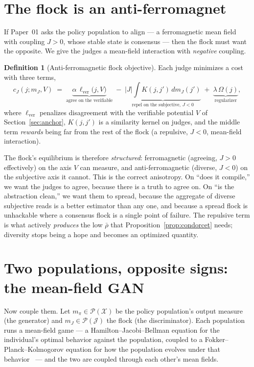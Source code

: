 \documentclass[11pt]{article}
\theoremstyle{definition}
\newtheorem{definition}{Definition}
\theoremstyle{remark}
\newcommand{\mpi}{m_{\pi}}
\newcommand{\mJ}{m_{J}}
\newcommand{\Prob}{\mathcal{P}}
\newcommand{\Xspace}{\mathcal{X}}
\newcommand{\Jspace}{\mathcal{J}}
\begin{document}
\section{The flock is an anti-ferromagnet}
\label{sec:antiferro}

If Paper~01 asks the policy population to align --- a ferromagnetic mean field with coupling $J>0$, whose
stable state is consensus --- then the flock must want the opposite. We give the judges a mean-field
interaction with \emph{negative} coupling.

\begin{definition}[Anti-ferromagnetic flock objective]
Each judge minimizes a cost with three terms,
\[
  c_J(j;\mJ,V)
   \;=\; \underbrace{\alpha\,\ell_{\text{ver}}\!\big(j,V\big)}_{\text{agree on the verifiable}}
   \;-\; \underbrace{|J|\!\!\int\! K(j,j')\,d\mJ(j')}_{\text{repel on the subjective, }J<0}
   \;+\; \underbrace{\lambda\,\Omega(j)}_{\text{regularizer}} ,
\]
where $\ell_{\text{ver}}$ penalizes disagreement with the verifiable potential $V$ of
Section~\ref{sec:anchor}, $K(j,j')$ is a similarity kernel on judges, and the middle term \emph{rewards}
being far from the rest of the flock (a repulsive, $J<0$, mean-field interaction).
\end{definition}

The flock's equilibrium is therefore \emph{structured}: ferromagnetic (agreeing, $J>0$ effectively) on
the axis $V$ can measure, and anti-ferromagnetic (diverse, $J<0$) on the subjective axis it cannot. This is
the correct anisotropy. On ``does it compile,'' we want the judges to agree, because there is a truth to
agree on. On ``is the abstraction clean,'' we want them to spread, because the aggregate of diverse
subjective reads is a better estimator than any one, and because a spread flock is unhackable where a
consensus flock is a single point of failure. The repulsive term is what actively \emph{produces} the low
$\bar\rho$ that Proposition~\ref{prop:condorcet} needs; diversity stops being a hope and becomes an
optimized quantity.

\section{Two populations, opposite signs: the mean-field GAN}
\label{sec:twopop}

Now couple them. Let $\mpi\in\Prob(\Xspace)$ be the policy population's output measure (the generator) and
$\mJ\in\Prob(\Jspace)$ the flock (the discriminator). Each population runs a mean-field game --- a
Hamilton--Jacobi--Bellman equation for the individual's optimal behavior against the population, coupled to
a Fokker--Planck--Kolmogorov equation for how the population evolves under that behavior~\cite{lasry2007mfg}
--- and the two are coupled through each other's mean fields.
\end{document}
